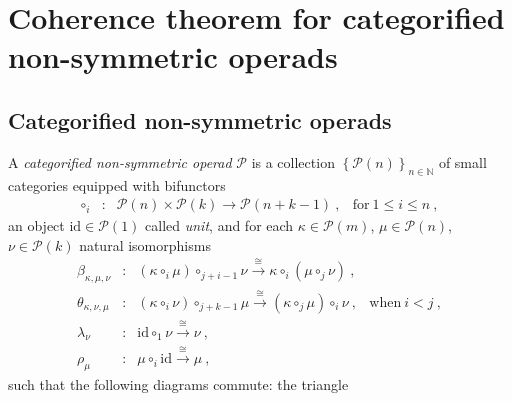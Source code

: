 
\section{Coherence theorem for categorified non-symmetric operads} 
\label{s:catoperads}


\subsection{Categorified non-symmetric operads}

\begin{definition} A \emph{categorified non-symmetric operad} $\mathcal{P}$ is a collection $\left\{  \mathcal{P}(n)  \right\}_{n\in \mathbb{N}}$ of small categories equipped with bifunctors  
$$ \begin{array}{clll}
\circ_i&\colon& \mathcal{P}(n) \times
                  \mathcal{P}(k)
                  \longrightarrow \mathcal{P}(n+k-1) \ ,
                  & \text{for}\ 1 \leq i \leq n \ ,
\end{array}  $$
an object $\mathrm{id} \in \mathcal{P}(1)$ called \emph{unit}, and for each $\kappa \in \mathcal{P}(m)$,  $\mu \in \mathcal{P}(n)$, $\nu \in \mathcal{P}(k)$ natural isomorphisms 
$$ \begin{array}{clll}
    \beta_{\kappa,\mu,\nu}&\colon& 
    (\kappa \circ_i \mu) \circ_{j+i-1} \nu  \overset{\cong}{\longrightarrow} \kappa \circ_i (\mu \circ_j \nu) \ , &  \\
    \theta_{\kappa,\nu,\mu}&\colon& 
    (\kappa \circ_i \nu) \circ_{j+k-1} \mu 
    \overset{\cong}{\longrightarrow} (\kappa \circ_j \mu) \circ_i \nu \ , & \text{when}\ i < j \ , \\
    \lambda_\nu &\colon& 
    \mathrm{id} \circ_1 \nu \overset{\cong}{\longrightarrow} \nu \ , & \\
    \rho_\mu &\colon& 
    \mu \circ_i \mathrm{id} \overset{\cong}{\longrightarrow} \mu \ , & 
\end{array}  $$
such that the following diagrams commute: the triangle \\
\begin{center}
\end{center}
\end{definition}
